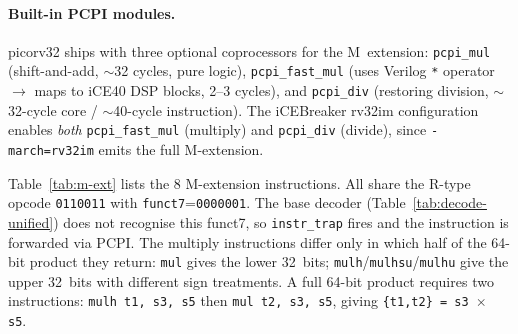 \documentclass[9pt, a4paper]{extarticle}
\begin{document}
\paragraph{Built-in PCPI modules.} picorv32 ships with three optional coprocessors for the M~extension: \texttt{pcpi\_mul} (shift-and-add, $\sim$32 cycles, pure logic), \texttt{pcpi\_fast\_mul} (uses Verilog \texttt{*} operator $\to$ maps to iCE40 DSP blocks, 2--3 cycles), and \texttt{pcpi\_div} (restoring division, $\sim$32-cycle core / $\sim$40-cycle instruction). The iCEBreaker rv32im configuration enables \emph{both} \texttt{pcpi\_fast\_mul} (multiply) and \texttt{pcpi\_div} (divide), since \texttt{-march=rv32im} emits the full M-extension.

Table~\ref{tab:m-ext} lists the 8 M-extension instructions. All share the R-type opcode \texttt{0110011} with \texttt{funct7}=\texttt{0000001}. The base decoder (Table~\ref{tab:decode-unified}) does not recognise this funct7, so \texttt{instr\_trap} fires and the instruction is forwarded via PCPI. The multiply instructions differ only in which half of the 64-bit product they return: \texttt{mul} gives the lower 32~bits; \texttt{mulh}/\texttt{mulhsu}/\texttt{mulhu} give the upper 32~bits with different sign treatments. A full 64-bit product requires two instructions: \texttt{mulh~t1,~s3,~s5} then \texttt{mul~t2,~s3,~s5}, giving \texttt{\{t1,t2\} = s3 $\times$ s5}.
\end{document}
